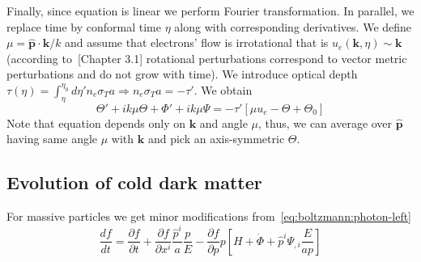 \documentclass[12pt]{extarticle}
\numberwithin{problem}{section}
\numberwithin{theorem}{section}
\begin{document}
	Finally, since equation is linear we perform Fourier transformation. In parallel, we replace time by conformal time $\eta$ along with corresponding derivatives. We define $\mu = \mathbf{\hat{p}}\cdot\mathbf{k} / k$ and assume that electrons' flow is irrotational that is $u_e(\mathbf{k}, \eta)\sim\mathbf{k}$ (according to~\cite{gorbunov-rubakov-2:2011}[Chapter 3.1] rotational perturbations correspond to vector metric perturbations and do not grow with time). We introduce optical depth $\tau(\eta) = \int^{\eta_0}_\eta d\eta' n_e\sigma_Ta \Rightarrow n_e\sigma_Ta = -\tau'$. We obtain
	\begin{equation}
		\label{eq:theta}
		\Theta' + ik\mu\Theta + \Phi' + ik\mu\Psi = -\tau'[\mu u_e - \Theta + \Theta_0]
	\end{equation}
	Note that equation depends only on $\mathbf{k}$ and angle $\mu$, thus, we can average over $\mathbf{\hat{p}}$ having same angle $\mu$ with $\mathbf{k}$ and pick an axis-symmetric $\Theta$.
	
	\subsection{Evolution of cold dark matter}
	For massive particles we get minor modifications from~\ref{eq:boltzmann:photon-left}
	\begin{equation}
		\label{eq:boltzmann:cold}
		\frac{df}{dt} = \frac{\partial f}{\partial t} + \frac{\partial f}{\partial x^i}\frac{\hat{p}^i}{a}\frac{p}{E} - \frac{\partial f}{\partial p}p\left[H + \dot{\Phi} + \hat{p}^i\Psi_{,i} \frac{E}{ap}\right]
	\end{equation}
	
\end{document}
